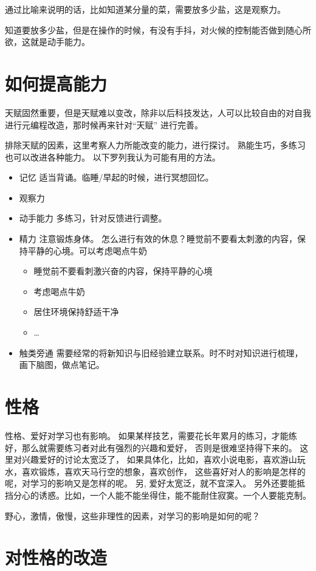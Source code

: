 \documentclass{book}
\begin{document}
通过比喻来说明的话，比如知道某分量的菜，需要放多少盐，这是观察力。

知道要放多少盐，但是在操作的时候，有没有手抖，对火候的控制能否做到随心所欲，这就是动手能力。

\section{如何提高能力}
天赋固然重要，但是天赋难以变改，除非以后科技发达，人可以比较自由的对自我进行元编程改造，那时候再来针对“天赋”
进行完善。

排除天赋的因素，这里考察人力所能改变的能力，进行探讨。
熟能生巧，多练习也可以改进各种能力。
以下罗列我认为可能有用的方法。
\begin{itemize}
    \item 记忆 \newline
        适当背诵。临睡/早起的时候，进行冥想回忆。
    \item 观察力
    \item 动手能力 \newline
        多练习，针对反馈进行调整。
    \item 精力 \newline
        注意锻炼身体。
        怎么进行有效的休息？睡觉前不要看太刺激的内容，保持平静的心境。可以考虑喝点牛奶
        \begin{itemize}
            \item 睡觉前不要看刺激兴奋的内容，保持平静的心境
            \item 考虑喝点牛奶
            \item 居住环境保持舒适干净
            \item \dots
        \end{itemize}
    \item 触类旁通 \newline
        需要经常的将新知识与旧经验建立联系。时不时对知识进行梳理，画下脑图，做点笔记。
\end{itemize}

\section{性格}
性格、爱好对学习也有影响。
如果某样技艺，需要花长年累月的练习，才能练好，那么就需要练习者对此有强烈的兴趣和爱好，
否则是很难坚持得下来的。
这里对兴趣爱好的讨论太宽泛了，
如果具体化，比如，喜欢小说电影，喜欢游山玩水，喜欢锻炼，喜欢天马行空的想象，喜欢创作，
这些喜好对人的影响是怎样的呢，对学习的影响又是怎样的呢。
另, 爱好太宽泛，就不宜深入。
另外还要能抵挡分心的诱惑。比如，一个人能不能坐得住，能不能耐住寂寞。一个人要能克制。

野心，激情，傲慢，这些非理性的因素，对学习的影响是如何的呢？

\section{对性格的改造}
\end{document}
